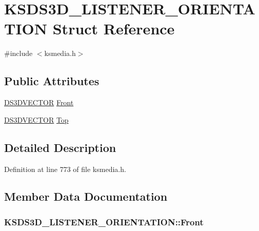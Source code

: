 \hypertarget{struct_k_s_d_s3_d___l_i_s_t_e_n_e_r___o_r_i_e_n_t_a_t_i_o_n}{}\section{K\+S\+D\+S3\+D\+\_\+\+L\+I\+S\+T\+E\+N\+E\+R\+\_\+\+O\+R\+I\+E\+N\+T\+A\+T\+I\+ON Struct Reference}
\label{struct_k_s_d_s3_d___l_i_s_t_e_n_e_r___o_r_i_e_n_t_a_t_i_o_n}


{\ttfamily \#include $<$ksmedia.\+h$>$}

\subsection*{Public Attributes}
\begin{DoxyCompactItemize}
\item 
\hyperlink{ksmedia_8h_aec2ed92bfacc9df991ae7ef642c4c18e}{D\+S3\+D\+V\+E\+C\+T\+OR} \hyperlink{struct_k_s_d_s3_d___l_i_s_t_e_n_e_r___o_r_i_e_n_t_a_t_i_o_n_a49d81ba273cdfdbd949d7c9c9b3120f4}{Front}
\item 
\hyperlink{ksmedia_8h_aec2ed92bfacc9df991ae7ef642c4c18e}{D\+S3\+D\+V\+E\+C\+T\+OR} \hyperlink{struct_k_s_d_s3_d___l_i_s_t_e_n_e_r___o_r_i_e_n_t_a_t_i_o_n_ad155615c52991f91dbb57b1a1d57b408}{Top}
\end{DoxyCompactItemize}


\subsection{Detailed Description}


Definition at line 773 of file ksmedia.\+h.



\subsection{Member Data Documentation}
\subsubsection[{\texorpdfstring{Front}{Front}}]{ K\+S\+D\+S3\+D\+\_\+\+L\+I\+S\+T\+E\+N\+E\+R\+\_\+\+O\+R\+I\+E\+N\+T\+A\+T\+I\+O\+N\+::\+Front}\hypertarget{struct_k_s_d_s3_d___l_i_s_t_e_n_e_r___o_r_i_e_n_t_a_t_i_o_n_a49d81ba273cdfdbd949d7c9c9b3120f4}{}\label{struct_k_s_d_s3_d___l_i_s_t_e_n_e_r___o_r_i_e_n_t_a_t_i_o_n_a49d81ba273cdfdbd949d7c9c9b3120f4}


